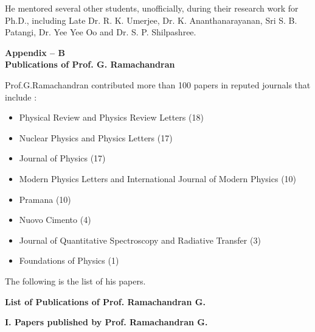 He mentored several other students, unofficially, during their research work for Ph.D., including Late Dr. R. K. Umerjee, Dr. K. Ananthanarayanan, Sri S. B. Patangi, Dr. Yee Yee Oo and Dr. S. P. Shilpashree.

\begin{center}
\textbf{Appendix -- B}\\[4pt]
\textbf{Publications of Prof. G. Ramachandran}
\end{center}

Prof.G.Ramachandran contributed more than 100 papers in reputed journals that include :
\begin{itemize}
\item Physical Review and Physics Review Letters (18)
\item Nuclear Physics and Physics Letters (17)
\item Journal of Physics (17)
\item Modern Physics Letters and International Journal of Modern Physics (10) 
\item Pramana (10)
\item Nuovo Cimento (4)
\item Journal of Quantitative Spectroscopy and Radiative Transfer (3)
\item Foundations of Physics (1)
\end{itemize}

The following is the list of his papers.

\newpage

\begin{center}
{\large\bfseries List of Publications of Prof. Ramachandran G.}
\end{center}

\noindent
\textbf{I. Papers published by Prof. Ramachandran G.}

\medskip

